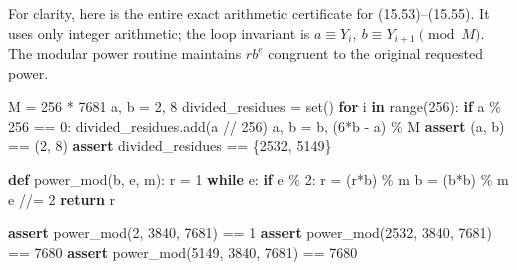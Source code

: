 \documentclass[
  11pt,
  a4paper,
]{article}
\newenvironment{Shaded}{}{}
\newcommand{\BuiltInTok}[1]{\textcolor[rgb]{0.00,0.50,0.00}{#1}}
\newcommand{\ControlFlowTok}[1]{\textcolor[rgb]{0.00,0.44,0.13}{\textbf{#1}}}
\newcommand{\DecValTok}[1]{\textcolor[rgb]{0.25,0.63,0.44}{#1}}
\newcommand{\KeywordTok}[1]{\textcolor[rgb]{0.00,0.44,0.13}{\textbf{#1}}}
\newcommand{\NormalTok}[1]{#1}
\newcommand{\OperatorTok}[1]{\textcolor[rgb]{0.40,0.40,0.40}{#1}}
\begin{document}
For clarity, here is the entire exact arithmetic certificate for
(15.53)--(15.55). It uses only integer arithmetic; the loop invariant is
\(a\equiv Y_i,\ b\equiv Y_{i+1}\pmod M\). The modular power routine
maintains \(r b^e\) congruent to the original requested power.

\begin{Shaded}
\begin{Highlighting}[]
\NormalTok{M }\OperatorTok{=} \DecValTok{256} \OperatorTok{*} \DecValTok{7681}
\NormalTok{a, b }\OperatorTok{=} \DecValTok{2}\NormalTok{, }\DecValTok{8}
\NormalTok{divided\_residues }\OperatorTok{=} \BuiltInTok{set}\NormalTok{()}
\ControlFlowTok{for}\NormalTok{ i }\KeywordTok{in} \BuiltInTok{range}\NormalTok{(}\DecValTok{256}\NormalTok{):}
    \ControlFlowTok{if}\NormalTok{ a }\OperatorTok{\%} \DecValTok{256} \OperatorTok{==} \DecValTok{0}\NormalTok{:}
\NormalTok{        divided\_residues.add(a }\OperatorTok{//} \DecValTok{256}\NormalTok{)}
\NormalTok{    a, b }\OperatorTok{=}\NormalTok{ b, (}\DecValTok{6}\OperatorTok{*}\NormalTok{b }\OperatorTok{{-}}\NormalTok{ a) }\OperatorTok{\%}\NormalTok{ M}
\ControlFlowTok{assert}\NormalTok{ (a, b) }\OperatorTok{==}\NormalTok{ (}\DecValTok{2}\NormalTok{, }\DecValTok{8}\NormalTok{)}
\ControlFlowTok{assert}\NormalTok{ divided\_residues }\OperatorTok{==}\NormalTok{ \{}\DecValTok{2532}\NormalTok{, }\DecValTok{5149}\NormalTok{\}}

\KeywordTok{def}\NormalTok{ power\_mod(b, e, m):}
\NormalTok{    r }\OperatorTok{=} \DecValTok{1}
    \ControlFlowTok{while}\NormalTok{ e:}
        \ControlFlowTok{if}\NormalTok{ e }\OperatorTok{\%} \DecValTok{2}\NormalTok{:}
\NormalTok{            r }\OperatorTok{=}\NormalTok{ (r}\OperatorTok{*}\NormalTok{b) }\OperatorTok{\%}\NormalTok{ m}
\NormalTok{        b }\OperatorTok{=}\NormalTok{ (b}\OperatorTok{*}\NormalTok{b) }\OperatorTok{\%}\NormalTok{ m}
\NormalTok{        e }\OperatorTok{//=} \DecValTok{2}
    \ControlFlowTok{return}\NormalTok{ r}

\ControlFlowTok{assert}\NormalTok{ power\_mod(}\DecValTok{2}\NormalTok{, }\DecValTok{3840}\NormalTok{, }\DecValTok{7681}\NormalTok{) }\OperatorTok{==} \DecValTok{1}
\ControlFlowTok{assert}\NormalTok{ power\_mod(}\DecValTok{2532}\NormalTok{, }\DecValTok{3840}\NormalTok{, }\DecValTok{7681}\NormalTok{) }\OperatorTok{==} \DecValTok{7680}
\ControlFlowTok{assert}\NormalTok{ power\_mod(}\DecValTok{5149}\NormalTok{, }\DecValTok{3840}\NormalTok{, }\DecValTok{7681}\NormalTok{) }\OperatorTok{==} \DecValTok{7680}
\end{Highlighting}
\end{Shaded}
\end{document}
